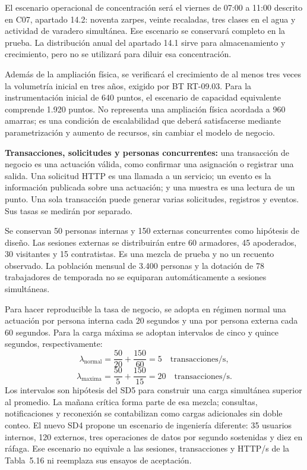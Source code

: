 El escenario operacional de concentración será el viernes de 07:00 a 11:00 descrito en C07, apartado 14.2: noventa zarpes, veinte recaladas, tres clases en el agua y actividad de varadero simultánea. Ese escenario se conservará completo en la prueba. La distribución anual del apartado 14.1 sirve para almacenamiento y crecimiento, pero no se utilizará para diluir esa concentración.

Además de la ampliación física, se verificará el crecimiento de al menos tres veces la volumetría inicial en tres años, exigido por BT RT-09.03. Para la instrumentación inicial de 640 puntos, el escenario de capacidad equivalente comprende 1.920 puntos. No representa una ampliación física acordada a 960 amarras; es una condición de escalabilidad que deberá satisfacerse mediante parametrización y aumento de recursos, sin cambiar el modelo de negocio.

\textbf{Transacciones, solicitudes y personas concurrentes:} una transacción de negocio es una actuación válida, como confirmar una asignación o registrar una salida. Una solicitud HTTP es una llamada a un servicio; un evento es la información publicada sobre una actuación; y una muestra es una lectura de un punto. Una sola transacción puede generar varias solicitudes, registros y eventos. Sus tasas se medirán por separado.

Se conservan 50 personas internas y 150 externas concurrentes como hipótesis de diseño. Las sesiones externas se distribuirán entre 60 armadores, 45 apoderados, 30 visitantes y 15 contratistas. Es una mezcla de prueba y no un recuento observado. La población mensual de 3.400 personas y la dotación de 78 trabajadores de temporada no se equiparan automáticamente a sesiones simultáneas.

Para hacer reproducible la tasa de negocio, se adopta en régimen normal una actuación por persona interna cada 20 segundos y una por persona externa cada 60 segundos. Para la carga máxima se adoptan intervalos de cinco y quince segundos, respectivamente:
\[
\lambda_{\mathrm{normal}}=\frac{50}{20}+\frac{150}{60}=5
\quad\mbox{transacciones/s},
\]
\[
\lambda_{\mathrm{maxima}}=\frac{50}{5}+\frac{150}{15}=20
\quad\mbox{transacciones/s}.
\]
Los intervalos son hipótesis del SD5 para construir una carga simultánea superior al promedio. La mañana crítica forma parte de esa mezcla; consultas, notificaciones y reconexión se contabilizan como cargas adicionales sin doble conteo. El nuevo SD4 propone un escenario de ingeniería diferente: 35 usuarios internos, 120 externos, tres operaciones de datos por segundo sostenidas y diez en ráfaga. Ese escenario no equivale a las sesiones, transacciones y HTTP/s de la Tabla~5.16 ni reemplaza sus ensayos de aceptación.

